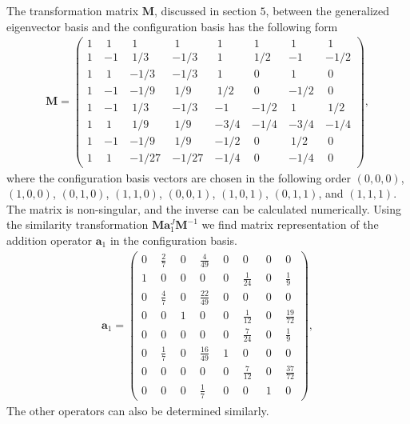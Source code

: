 \documentclass[11pt,a4paper]{book}
\begin{document}
The transformation matrix $\mathbf{M}$, discussed in section $5$, between
the generalized eigenvector basis and the
configuration basis has the following form
\begin{align}
  \textbf{M} = 
  \begin{pmatrix}
    1 ~&~ 1 ~&~ 1 ~&~ 1 ~&~ 1 ~&~ 1 ~&~ 1 ~&~ 1 \\
    1 ~& -1 ~&~ 1/3 ~& -1/3 ~&~ 1 ~&~ 1/2 ~& -1 ~& -1/2 \\
    1 ~&~ 1 ~& -1/3 ~& -1/3 ~&~ 1 ~&~ 0 ~&~ 1 ~&~ 0 \\
    1 ~& -1 ~& -1/9 ~&~ 1/9 ~&~ 1/2 ~&~ 0 ~& -1/2 ~&~ 0 \\
    1 ~& -1 ~&~ 1/3 ~& -1/3 ~& -1 ~& -1/2 ~&~ 1 ~&~ 1/2 \\
    1 ~&~ 1 ~&~ 1/9 ~&~ 1/9 ~& -3/4 ~& -1/4 ~& -3/4 ~& -1/4 \\
    1 ~& -1 ~& -1/9 ~&~ 1/9 ~& -1/2 ~&~ 0 ~&~ 1/2 ~&~ 0 \\
    1 ~&~ 1 ~& -1/27 ~& -1/27 ~& -1/4 ~&~ 0 ~& -1/4 ~&~ 0 
  \end{pmatrix},
\end{align}
where the configuration basis vectors are chosen in the following order
$(0, 0, 0)$, $(1, 0, 0)$, $(0, 1, 0)$, $(1, 1, 0)$, $(0, 0, 1)$,
$(1, 0, 1)$, $(0, 1, 1)$, and $(1, 1, 1)$. The matrix is non-singular,
and the inverse can be calculated numerically.
Using the similarity transformation $\mathbf{M}\mathbf{a}_1^J\mathbf{M}^{-1}$ we find matrix
representation of the addition operator $\mathbf{a}_1$ in the configuration
basis.
\begin{align}
  \textbf{a}_1 =
  \begin{pmatrix}
    0 ~&~ \frac{2}{7} ~&~ 0 ~&~ \frac{4}{49} ~&~ 0 ~&~ 0 ~&~ 0 ~&~ 0 \\
    1 ~&~ 0 ~&~ 0 ~&~ 0 ~&~ 0 ~&~ \frac{1}{24} ~&~ 0 ~&~ \frac{1}{9} \\
    0 ~&~ \frac{4}{7} ~&~ 0 ~&~ \frac{22}{49} ~&~ 0 ~&~ 0 ~&~ 0 ~&~ 0 \\
    0 ~&~ 0 ~&~ 1 ~&~ 0 ~&~ 0 ~&~ \frac{1}{12} ~&~ 0 ~&~ \frac{19}{72} \\
    0 ~&~ 0 ~&~ 0 ~&~ 0 ~&~ 0 ~&~ \frac{7}{24} ~&~ 0 ~&~ \frac{1}{9} \\
    0 ~&~ \frac{1}{7} ~&~ 0 ~&~ \frac{16}{49} ~&~ 1 ~&~ 0 ~&~ 0 ~&~ 0 \\
    0 ~&~ 0 ~&~ 0 ~&~ 0 ~&~ 0 ~&~ \frac{7}{12} ~&~ 0 ~&~ \frac{37}{72} \\
    0 ~&~ 0 ~&~ 0 ~&~ \frac{1}{7} ~&~ 0 ~&~ 0 ~&~ 1 ~&~ 0 
  \end{pmatrix},
\end{align}
The other operators can also be determined similarly.
























{}
\end{document}
